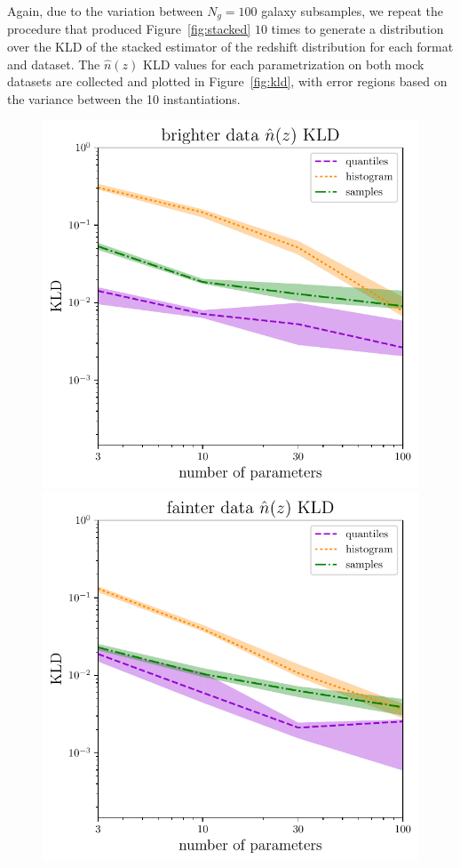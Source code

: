 \documentclass[\docopts]{\docclass}
\begin{document}
Again, due to the variation between $N_{g}=100$ galaxy subsamples, we repeat 
the procedure that produced Figure~\ref{fig:stacked} $10$ times to generate a 
distribution over the KLD of the stacked estimator of the redshift distribution 
for each format and dataset.
The $\hat{n}(z)$ KLD values for each parametrization on both mock datasets are 
collected and plotted in Figure~\ref{fig:kld}, with error regions based on the 
variance between the 10 instantiations.
\begin{figure}
  \begin{center}
    \includegraphics[width=\columnwidth]{graham_nz_kld.pdf}    
\includegraphics[width=\columnwidth]{schmidt_nz_kld.pdf}

\end{center}
\end{figure}
\end{document}
